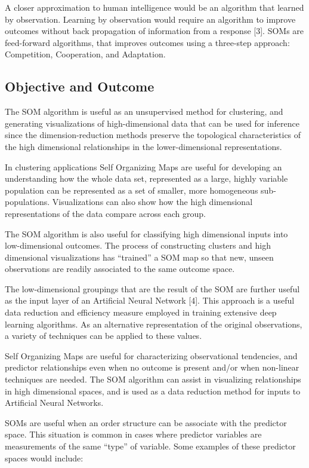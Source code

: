 \documentclass[12pt,]{article}
\begin{document}
A closer approximation to human intelligence would be an algorithm that
learned by observation. Learning by observation would require an
algorithm to improve outcomes without back propagation of information
from a response {[}3{]}. SOMs are feed-forward algorithms, that improves
outcomes using a three-step approach: Competition, Cooperation, and
Adaptation.

\hypertarget{objective-and-outcome}{%
\subsection{Objective and Outcome}\label{objective-and-outcome}}

The SOM algorithm is useful as an unsupervised method for clustering,
and generating visualizations of high-dimensional data that can be used
for inference since the dimension-reduction methods preserve the
topological characteristics of the high dimensional relationships in the
lower-dimensional representations.

In clustering applications Self Organizing Maps are useful for
developing an understanding how the whole data set, represented as a
large, highly variable population can be represented as a set of
smaller, more homogeneous sub-populations. Visualizations can also show
how the high dimensional representations of the data compare across each
group.

The SOM algorithm is also useful for classifying high dimensional inputs
into low-dimensional outcomes. The process of constructing clusters and
high dimensional visualizations has ``trained'' a SOM map so that new,
unseen observations are readily associated to the same outcome space.

The low-dimensional groupings that are the result of the SOM are further
useful as the input layer of an Artificial Neural Network {[}4{]}. This
approach is a useful data reduction and efficiency measure employed in
training extensive deep learning algorithms. As an alternative
representation of the original observations, a variety of techniques can
be applied to these values.

Self Organizing Maps are useful for characterizing observational
tendencies, and predictor relationships even when no outcome is present
and/or when non-linear techniques are needed. The SOM algorithm can
assist in visualizing relationships in high dimensional spaces, and is
used as a data reduction method for inputs to Artificial Neural
Networks.

SOMs are useful when an order structure can be associate with the
predictor space. This situation is common in cases where predictor
variables are measurements of the same ``type'' of variable. Some
examples of these predictor spaces would include:
\end{document}
